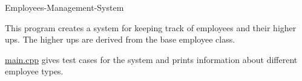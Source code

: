Employees-\/\+Management-\/\+System

This program creates a system for keeping track of employees and their higher ups. The higher ups are derived from the base employee class.

\hyperlink{main_8cpp}{main.\+cpp} gives test cases for the system and prints information about different employee types. 